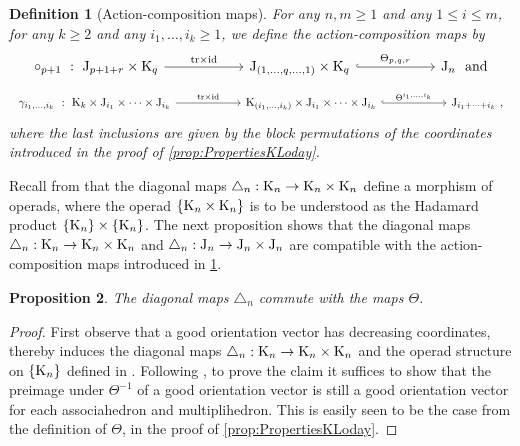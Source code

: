 \documentclass[twoside, 11pt]{amsart}
\newtheorem{definition}{Definition}[section]
\newtheorem{proposition}[definition]{Proposition}
\theoremstyle{remark}
\begin{document}
\begin{definition}[Action-composition maps] \label{def:action-composition}
For any $n,m\geq 1$ and any $1\leq i \leq m$, for any $k\geq 2$ and any $i_1,\ldots,i_k \geq 1$, we define the \emph{action-composition maps}  by 
\[
\vcenter{\hbox{
\begin{tikzcd}[column sep=1cm]
\circ_{p+1}\ : \ \J_{p+1+r}\times \K_q
\arrow[rr,  "\tr\times \id"]
& & 
\J_{(1,\ldots,q,\ldots,1)}\times \K_q 
\arrow[rr,hookrightarrow, "\Theta_{p,q,r}"]
&  &
\J_{n}\ \ \text{and}
\end{tikzcd}
}}
\]
\[
\vcenter{\hbox{
\begin{tikzcd}[column sep=1cm]
\gamma_{i_1,\ldots,i_k}\ : \ \K_{k}\times \J_{i_1} \times \cdots \times \J_{i_k}
\arrow[rr,  "\tr\times \id"]
& &
\K_{(i_1,\ldots,i_k)} \times \J_{i_1} \times \cdots \times \J_{i_k} 
\arrow[rr,hookrightarrow, "\Theta^{i_1, \ldots , i_k}"]
& &
\J_{i_1+\cdots + i_k}\ , 
\end{tikzcd}
}}
\]
where the last inclusions are given by the block permutations of the coordinates introduced in the proof of \cref{prop:PropertiesKLoday}. 
\end{definition}

Recall from \cite[Theorem 1]{MTTV19} that the diagonal maps $\triangle_n : \mathrm{K}_n \to \mathrm{K}_n \times \mathrm{K}_n$ define a morphism of operads, where the operad $\{ \mathrm{K}_n \times \mathrm{K}_n \}$ is to be understood as the Hadamard product $\{ \mathrm{K}_n \} \times \{ \mathrm{K}_n \}$.
The next proposition shows that the diagonal maps $\triangle_n : \mathrm{K}_n \to \mathrm{K}_n \times \mathrm{K}_n$ and $\triangle_n : \mathrm{J}_n \to \mathrm{J}_n \times \mathrm{J}_n$ are compatible with the action-composition maps introduced in \cref{def:action-composition}.

\begin{proposition} 
\label{prop:thetacommutes}
The diagonal maps $\triangle_n$ commute with the maps $\Theta$.  
\end{proposition}

\begin{proof}
First observe that a good orientation vector has decreasing coordinates, thereby induces the diagonal maps $\triangle_n : \mathrm{K}_n \to \mathrm{K}_n \times \mathrm{K}_n$ and the operad structure on $\{\mathrm{K}_n\}$ defined in \cite{MTTV19}. 
Following \cite[Proposition 4.14]{LA21}, to prove the claim it suffices to show that the preimage under $\Theta^{-1}$ of a good orientation vector is still a good orientation vector for each associahedron and multiplihedron. 
This is easily seen to be the case from the definition of $\Theta$, in the proof of \cref{prop:PropertiesKLoday}. 
\end{proof}
\end{document}
